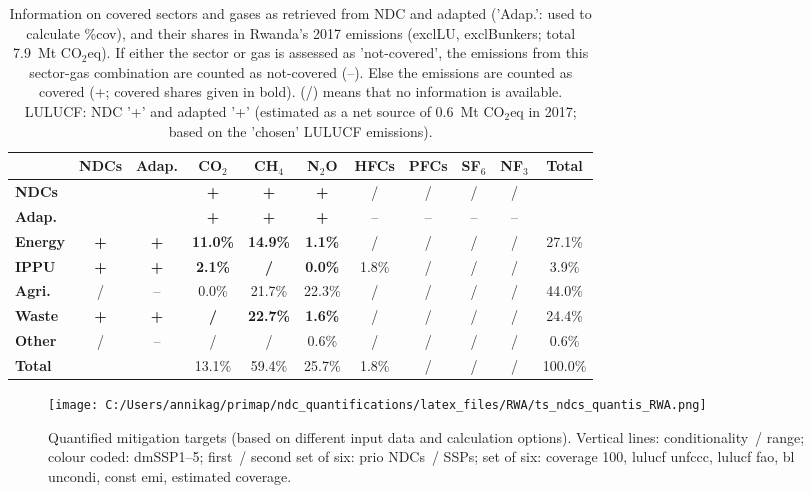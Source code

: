 \documentclass[12pt]{article}
\begin{document}
 \begin{table}[H]\small
 \centering
 \caption{Information on covered sectors and gases as retrieved from NDC and adapted ('Adap.': used to calculate \%cov), and their shares in Rwanda's 2017 emissions (exclLU, exclBunkers; total 7.9~Mt CO$_2$eq).
 If either the sector or gas is assessed as 'not-covered', the emissions from this sector-gas combination are counted as not-covered (--). 
 Else the emissions are counted as covered (+; covered shares given in bold).
 (/) means that no information is available.
 LULUCF: NDC '+' and adapted '+' (estimated as a net source of 0.6~Mt CO$_2$eq in 2017; based on the 'chosen' LULUCF emissions).}
 \label{tab:coveredSectorsGases}
 \begin{tabular}{l || c c || c c c c c c c | c}
 \bfseries  & \bfseries NDCs & \bfseries Adap. & \bfseries CO$_2$ & \bfseries CH$_4$ & \bfseries N$_2$O & \bfseries HFCs & \bfseries PFCs & \bfseries SF$_6$ & \bfseries NF$_3$ & \bfseries Total \tabularnewline \hline \hline
 \bfseries NDCs &  &  & \bfseries + & \bfseries + & \bfseries + & / & / & / & / &  \tabularnewline 
 \bfseries Adap. &  &  & \bfseries + & \bfseries + & \bfseries + & -- & -- & -- & -- &  \tabularnewline \hline \hline
 \bfseries Energy & \bfseries + & \bfseries + & \bfseries 11.0\% & \bfseries 14.9\% & \bfseries 1.1\% & / & / & / & / & 27.1\% \tabularnewline 
 \bfseries IPPU & \bfseries + & \bfseries + & \bfseries 2.1\% & \bfseries / & \bfseries 0.0\% & 1.8\% & / & / & / & 3.9\% \tabularnewline 
 \bfseries Agri. & / & -- & 0.0\% & 21.7\% & 22.3\% & / & / & / & / & 44.0\% \tabularnewline 
 \bfseries Waste & \bfseries + & \bfseries + & \bfseries / & \bfseries 22.7\% & \bfseries 1.6\% & / & / & / & / & 24.4\% \tabularnewline 
 \bfseries Other & / & -- & / & / & 0.6\% & / & / & / & / & 0.6\% \tabularnewline \hline
 \bfseries Total &  &  & 13.1\% & 59.4\% & 25.7\% & 1.8\% & / & / & / & 100.0\% \tabularnewline 
 \end{tabular}
 \end{table}

 \begin{figure}[H]
 \centering
 \texttt{[image: C:/Users/annikag/primap/ndc\_quantifications/latex\_files/RWA/ts\_ndcs\_quantis\_RWA.png]}
 \caption{Quantified mitigation targets (based on different input data and calculation options).
 Vertical lines: conditionality~/ range;
 colour coded: dmSSP1--5;
 first~/ second set of six: prio NDCs~/ SSPs;
 set of six: coverage 100, lulucf unfccc, lulucf fao, bl uncondi, const emi, estimated coverage.}
 \label{fig:miti}
 \end{figure}
\end{document}
